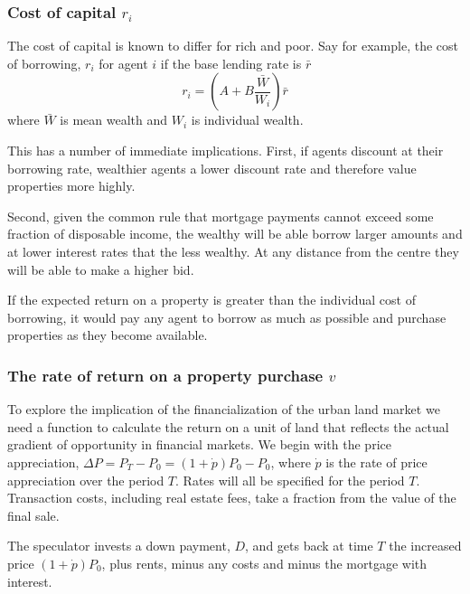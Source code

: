 \subsubsection{Cost of capital $r_i$}
The cost of capital is known to differ for rich and poor. Say for example, the cost of borrowing, $r_i$ for agent $i$ if the base lending rate is $\bar{r}$
 \[ r_i = (A + B \frac{\bar{W}}{W_i})\bar r\]
where $\bar{W}$ is mean wealth and $W_i$ is individual wealth. %


This has a number of immediate implications. First, if agents discount at their borrowing rate, wealthier agents a lower discount rate and therefore value properties more highly. 

Second, given the  common rule that mortgage payments cannot exceed some fraction of disposable income, the wealthy will be able borrow larger amounts and at lower interest rates that the less wealthy. At any distance from the centre they will be able to make a higher bid.
 
If the expected return on a property is greater than the individual cost of borrowing, it would pay any agent to borrow as much as possible and purchase properties as they become available.

\subsubsection{The rate of return on a property purchase $v$}
To explore the implication of the financialization of the urban land market we need a function to calculate the return on a unit of land that reflects the actual gradient of opportunity in financial markets. We begin with the price appreciation, $\Delta P=P_T-P_0 = (1+\dot p)P_0-P_0 $, where $\dot p$ is the rate of price appreciation over the period $T$. Rates will all be specified for the period $T$. Transaction costs, including real estate fees, take a fraction from the value of the final sale.

 The speculator invests a down payment, $D$, and gets back at time $T$ the  increased price $(1+\dot p)P_0$, plus rents, minus any costs and minus the mortgage with interest.
 
